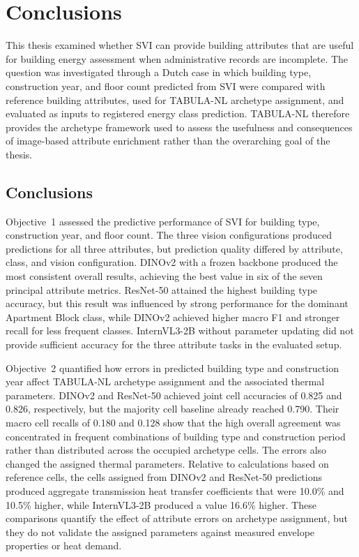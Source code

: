 \chapter{Conclusions}
\label{ch:conclusions}

This thesis examined whether \ac{SVI} can provide building attributes that are useful for building energy assessment when administrative records are incomplete.
The question was investigated through a Dutch case in which building type, construction year, and floor count predicted from \ac{SVI} were compared with reference building attributes, used for TABULA-NL archetype assignment, and evaluated as inputs to registered energy class prediction.
TABULA-NL therefore provides the archetype framework used to assess the usefulness and consequences of image-based attribute enrichment rather than the overarching goal of the thesis.

\section{Conclusions}
\label{sec:conclusions}

Objective~1 assessed the predictive performance of \ac{SVI} for building type, construction year, and floor count.
The three vision configurations produced predictions for all three attributes, but prediction quality differed by attribute, class, and vision configuration.
DINOv2 with a frozen backbone produced the most consistent overall results, achieving the best value in six of the seven principal attribute metrics.
ResNet-50 attained the highest building type accuracy, but this result was influenced by strong performance for the dominant Apartment Block class, while DINOv2 achieved higher macro F1 and stronger recall for less frequent classes.
InternVL3-2B without parameter updating did not provide sufficient accuracy for the three attribute tasks in the evaluated setup.

Objective~2 quantified how errors in predicted building type and construction year affect TABULA-NL archetype assignment and the associated thermal parameters.
DINOv2 and ResNet-50 achieved joint cell accuracies of 0.825 and 0.826, respectively, but the majority cell baseline already reached 0.790.
Their macro cell recalls of 0.180 and 0.128 show that the high overall agreement was concentrated in frequent combinations of building type and construction period rather than distributed across the occupied archetype cells.
The errors also changed the assigned thermal parameters.
Relative to calculations based on reference cells, the cells assigned from DINOv2 and ResNet-50 predictions produced aggregate transmission heat transfer coefficients that were 10.0\% and 10.5\% higher, while InternVL3-2B produced a value 16.6\% higher.
These comparisons quantify the effect of attribute errors on archetype assignment, but they do not validate the assigned parameters against measured envelope properties or heat demand.

